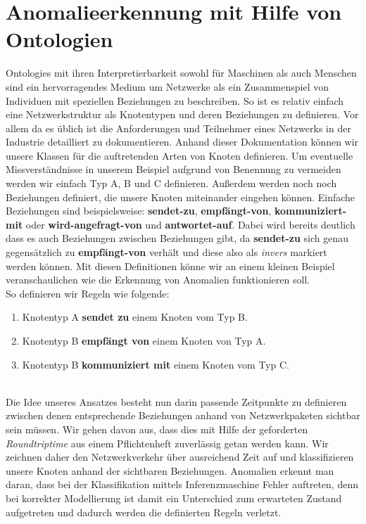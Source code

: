 \section{\nohyphens{Anomalieerkennung mit Hilfe von Ontologien}}
\Glspl{Ontologie} mit ihren Interpretierbarkeit sowohl für Maschinen als auch Menschen sind ein hervorragendes Medium um Netzwerke als ein Zusammenspiel von Individuen mit speziellen Beziehungen zu beschreiben. So ist es relativ einfach eine Netzwerkstruktur als Knotentypen und deren Beziehungen zu definieren. Vor allem da es üblich ist die Anforderungen und Teilnehmer eines Netzwerks in der Industrie detailliert zu dokumentieren. Anhand dieser Dokumentation können wir unsere Klassen für die auftretenden Arten von Knoten definieren. Um eventuelle Missverständnisse in unserem Beispiel aufgrund von Benennung zu vermeiden werden wir einfach Typ A, B und C definieren. Außerdem werden noch noch Beziehungen definiert, die unsere Knoten miteinander eingehen können. Einfache Beziehungen sind beispielsweise: \textbf{sendet-zu}, \textbf{empfängt-von}, \textbf{kommuniziert-mit} oder \textbf{wird-angefragt-von} und \textbf{antwortet-auf}. Dabei wird bereits deutlich dass es auch Beziehungen zwischen Beziehungen gibt, da \textbf{sendet-zu} sich genau gegensätzlich zu \textbf{empfängt-von} verhält und diese also als  \textit{invers} markiert werden können. Mit diesen Definitionen könne wir an einem kleinen Beispiel veranschaulichen wie die Erkennung von Anomalien funktionieren soll.\\
So definieren wir Regeln wie folgende:
\begin{enumerate}
\item Knotentyp A \textbf{sendet zu} einem Knoten vom Typ B.
\item Knotentyp B \textbf{empfängt von} einem Knoten von Typ A.
\item Knotentyp B \textbf{kommuniziert mit} einem Knoten vom Typ C.
\end{enumerate}
\par
[TODO: BILD]\\
Die Idee unseres Ansatzes besteht nun darin passende Zeitpunkte zu definieren zwischen denen entsprechende Beziehungen anhand von Netzwerkpaketen sichtbar sein müssen. Wir gehen davon aus, dass dies mit Hilfe der geforderten \textit{\Gls{Roundtriptime}} aus einem Pflichtenheft zuverlässig getan werden kann. Wir zeichnen daher den Netzwerkverkehr über ausreichend Zeit auf und klassifizieren unsere Knoten anhand der sichtbaren Beziehungen. Anomalien erkennt man daran, dass bei der Klassifikation mittels Inferenzmaschine Fehler auftreten, denn bei korrekter Modellierung ist damit ein Unterschied zum erwarteten Zustand aufgetreten und dadurch werden die definierten Regeln verletzt.

